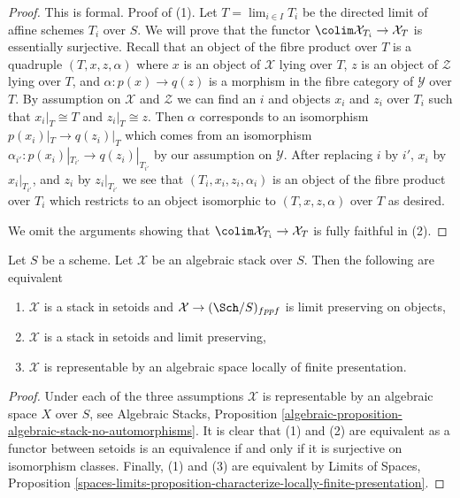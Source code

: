 \begin{proof}
This is formal. Proof of (1). Let $T = \lim_{i \in I} T_i$ be the directed
limit of affine schemes $T_i$ over $S$. We will prove that the functor
$\colim \mathcal{X}_{T_i} \to \mathcal{X}_T$ is essentially surjective.
Recall that an object of the fibre product over $T$ is a quadruple
$(T, x, z, \alpha)$ where $x$ is an object of $\mathcal{X}$ lying over $T$,
$z$ is an object of $\mathcal{Z}$ lying over $T$, and
$\alpha : p(x) \to q(z)$ is a morphism in the fibre category of
$\mathcal{Y}$ over $T$. By assumption on $\mathcal{X}$ and $\mathcal{Z}$
we can find an $i$ and objects $x_i$ and $z_i$ over $T_i$ such that
$x_i|_T \cong T$ and $z_i|_T \cong z$. Then $\alpha$ corresponds to
an isomorphism $p(x_i)|_T \to q(z_i)|_T$ which comes from an isomorphism
$\alpha_{i'} : p(x_i)|_{T_{i'}} \to q(z_i)|_{T_{i'}}$ by our assumption on
$\mathcal{Y}$. After replacing $i$ by $i'$, $x_i$ by $x_i|_{T_{i'}}$, and
$z_i$ by $z_i|_{T_{i'}}$ we see that $(T_i, x_i, z_i, \alpha_i)$
is an object of the fibre product over $T_i$ which restricts to
an object isomorphic to $(T, x, z, \alpha)$ over $T$ as desired.

\medskip\noindent
We omit the arguments showing that $\colim \mathcal{X}_{T_i} \to \mathcal{X}_T$
is fully faithful in (2).
\end{proof}

\begin{lemma}
\label{lemma-limit-preserving-algebraic-space}
Let $S$ be a scheme. Let $\mathcal{X}$ be an algebraic stack over $S$.
Then the following are equivalent
\begin{enumerate}
\item $\mathcal{X}$ is a stack in setoids and
$\mathcal{X} \to (\Sch/S)_{fppf}$ is limit preserving on objects,
\item $\mathcal{X}$ is a stack in setoids and limit preserving,
\item $\mathcal{X}$ is representable by an algebraic space
locally of finite presentation.
\end{enumerate}
\end{lemma}

\begin{proof}
Under each of the three assumptions $\mathcal{X}$ is representable
by an algebraic space $X$ over $S$, see Algebraic Stacks, Proposition
\ref{algebraic-proposition-algebraic-stack-no-automorphisms}.
It is clear that (1) and (2) are equivalent as a functor between
setoids is an equivalence if and only if it is surjective on isomorphism
classes. Finally, (1) and (3) are equivalent by
Limits of Spaces, Proposition
\ref{spaces-limits-proposition-characterize-locally-finite-presentation}.
\end{proof}





